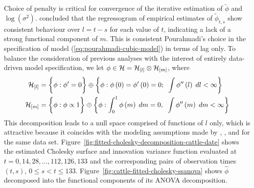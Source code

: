 \bigskip

Choice of penalty is critical for convergence of the iterative estimation of $\tilde{\phi}$ and $\log\left(\sigma^2 \right)$. \cite{pan2017jmcm} concluded that the regressogram of empirical estimates of $\tilde{\phi}_{t,s}$ show consistent behaviour over $l = t - s$ for each value of $t$, indicating a lack of a strong functional component of $m$. This is consistent Pourahmadi's choice in the specification of model (\ref{eq:pourahmadi-cubic-model}) in terms of lag only. To balance the consideration of previous analyses with the interest of entirely data-driven model specification, we let $\phi \in \mathcal{H} = \mathcal{H}_{\left[l\right]} \otimes \mathcal{H}_{\left[m\right]}$, where 
\begin{align*} 
\mathcal{H}_{\left[l\right]} &= \bigg\{ \phi: \phi' = 0 \bigg\} \oplus \left\{\phi: \phi\left(0\right) = {\phi'}\left(0\right) = 0; \;\; \int {\phi}''\left(l\right)\;dl < \infty   \right\} \\
\mathcal{H}_{\left[m\right]} &= \bigg\{ \phi: \phi \propto 1 \bigg\} \oplus \left\{ \phi: \int_0^1 \phi\left(m\right) \;dm = 0, \;\; \int {\phi}''\left(m\right)\;dm < \infty \right\} 
\end{align*} 
This decomposition leads to a null space comprised of functions of $l$ only, which is attractive because it coincides with the modeling assumptions made by \cite{pan2017jmcm}, \cite{huang2006covariance}, and \cite{wu2003nonparametric} for the same data set.  Figure~\ref{fig:fitted-cholesky-decomposition-cattle-date} shows the estimated Cholesky surface and innovation variance function evaluated at $t =  0,14, 28,\dots,112, 126,133$ and the corresponding pairs of observation times $\left(t,s\right)$, $0 \le s < t \le 133$. Figure~\ref{fig:cattle-fitted-cholesky-ssanova} shows $\hat{\phi}$ decomposed into the functional components of its ANOVA decomposition.





